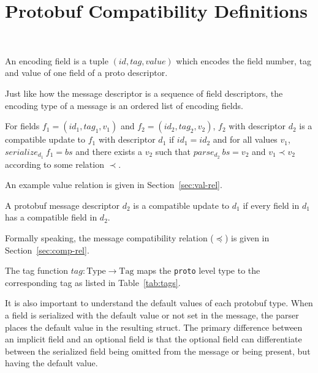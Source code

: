\section{Protobuf Compatibility Definitions}~\label{sec:comp-def}

\begin{definition}
	An encoding field is a tuple $(id, tag, value)$ which encodes the field
	number, tag and value of one field of a proto descriptor.
\end{definition}

Just like how the message descriptor is a sequence of field descriptors, the
encoding type of a message is an ordered list of encoding fields.

\begin{definition}
	For fields $f_1 = (id_1, tag_1, v_1)$ and $f_2 = (id_2, tag_2, v_2)$, $f_2$
	with descriptor $d_2$ is a compatible update to $f_1$ with descriptor $d_1$ if
	$id_1 = id_2$ and for all values $v_1$, $serialize_{d_1}\ f_1 = bs$ and there
	exists a $v_2$ such that $parse_{d_2}\ bs = v_2$ and $v_1 \prec v_2$ according to
	some relation $\prec$.
\end{definition}

An example value relation is given in Section~\ref{sec:val-rel}.

\begin{definition}
	A protobuf message descriptor $d_2$ is a compatible update to $d_1$ if every
	field in $d_1$ has a compatible field in $d_2$.
\end{definition}

Formally speaking, the message compatibility relation ($\preceq$) is given in
Section~\ref{sec:comp-rel}.

\begin{definition}
  The tag function $tag : \text{Type} \rightarrow \text{Tag}$ maps the \texttt{proto}
  level type to the corresponding tag as listed in Table~\ref{tab:tags}.
\end{definition}

It is also important to understand the default values of each protobuf
type. When a field is serialized with the default value or not set in the
message, the parser places the default value in the resulting struct. The
primary difference between an implicit field and an optional field is that the
optional field can differentiate between the serialized field being omitted from
the message or being present, but having the default value.

